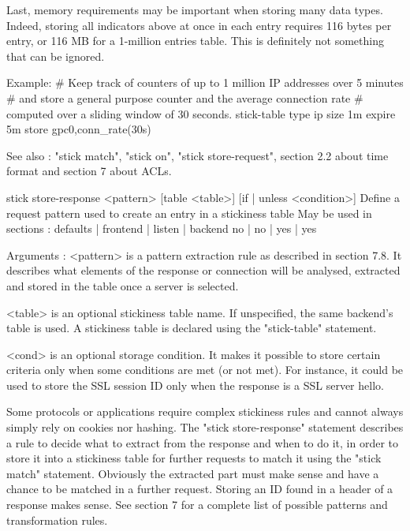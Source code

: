   Last, memory requirements may be important when storing many data types.
  Indeed, storing all indicators above at once in each entry requires 116 bytes
  per entry, or 116 MB for a 1-million entries table. This is definitely not
  something that can be ignored.

  Example:
        # Keep track of counters of up to 1 million IP addresses over 5 minutes
        # and store a general purpose counter and the average connection rate
        # computed over a sliding window of 30 seconds.
        stick-table type ip size 1m expire 5m store gpc0,conn_rate(30s)

  See also : "stick match", "stick on", "stick store-request", section 2.2
             about time format and section 7 about ACLs.


stick store-response <pattern> [table <table>] [{if | unless} <condition>]
  Define a request pattern used to create an entry in a stickiness table
  May be used in sections :   defaults | frontend | listen | backend
                                 no    |    no    |   yes  |   yes

  Arguments :
    <pattern>  is a pattern extraction rule as described in section 7.8. It
               describes what elements of the response or connection will
               be analysed, extracted and stored in the table once a
               server is selected.

    <table>    is an optional stickiness table name. If unspecified, the same
               backend's table is used. A stickiness table is declared using
               the "stick-table" statement.

    <cond>     is an optional storage condition. It makes it possible to store
               certain criteria only when some conditions are met (or not met).
               For instance, it could be used to store the SSL session ID only
               when the response is a SSL server hello.

  Some protocols or applications require complex stickiness rules and cannot
  always simply rely on cookies nor hashing. The "stick store-response"
  statement  describes a rule to decide what to extract from the response and
  when to do it, in order to store it into a stickiness table for further
  requests to match it using the "stick match" statement. Obviously the
  extracted part must make sense and have a chance to be matched in a further
  request. Storing an ID found in a header of a response makes sense.
  See section 7 for a complete list of possible patterns and transformation
  rules.

